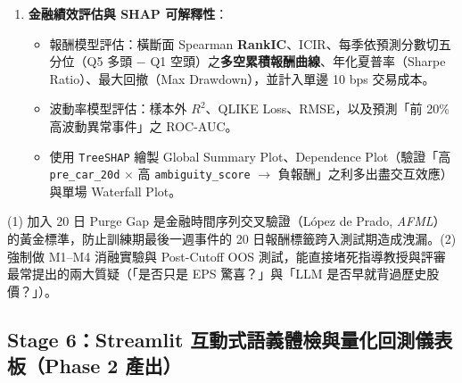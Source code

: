 \documentclass[11pt, a4paper]{article}
\begin{document}
\begin{enumerate}[leftmargin=1.5em, itemsep=2pt]
\begin{enumerate}[leftmargin=1.4em, itemsep=1pt]
        \item \textbf{M2（量價＋硬財報 SUE）}：M1 加入 \texttt{eps\_surprise\_pct}。
        \item \textbf{M3（純 LLM 語義＋模糊詞頻）}：僅輸入文本語義與偏移特徵。
        \item \textbf{M4（完整多模態融合模型）}：M2 + M3 + 動態 \texttt{expectation\_gap\_z}。
    \end{enumerate}
    \item \textbf{金融績效評估與 SHAP 可解釋性}：
    \begin{itemize}[leftmargin=1.2em]
        \item 報酬模型評估：橫斷面 Spearman \textbf{RankIC}、ICIR、每季依預測分數切五分位（Q5 多頭 $-$ Q1 空頭）之\textbf{多空累積報酬曲線}、年化夏普率（Sharpe Ratio）、最大回撤（Max Drawdown），並計入單邊 10 bps 交易成本。
        \item 波動率模型評估：樣本外 $R^2$、QLIKE Loss、RMSE，以及預測「前 20\% 高波動異常事件」之 ROC-AUC。
        \item 使用 \texttt{TreeSHAP} 繪製 Global Summary Plot、Dependence Plot（驗證「高 \texttt{pre\_car\_20d} $\times$ 高 \texttt{ambiguity\_score} $\rightarrow$ 負報酬」之利多出盡交互效應）與單場 Waterfall Plot。
    \end{itemize}
\end{enumerate}

\begin{whybox}
(1) 加入 20 日 Purge Gap 是金融時間序列交叉驗證（López de Prado, \textit{AFML}）的黃金標準，防止訓練期最後一週事件的 20 日報酬標籤跨入測試期造成洩漏。(2) 強制做 M1--M4 消融實驗與 Post-Cutoff OOS 測試，能直接堵死指導教授與評審最常提出的兩大質疑（「是否只是 EPS 驚喜？」與「LLM 是否早就背過歷史股價？」）。
\end{whybox}

\subsection{Stage 6：Streamlit 互動式語義體檢與量化回測儀表板（Phase 2 產出）}
\end{document}
